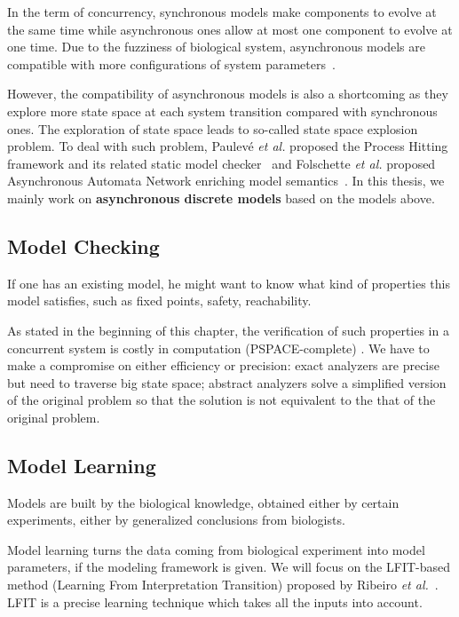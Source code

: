 In the term of concurrency, synchronous models make components to evolve at the same time while asynchronous ones allow at most one component to evolve at one time.
Due to the fuzziness of biological system, asynchronous models are compatible with more configurations of system parameters~\cite{bernot2009}.

However, the compatibility of asynchronous models is also a shortcoming as they explore more state space at each system transition compared with synchronous ones.
The exploration of state space leads to so-called state space explosion problem.
To deal with such problem, Paulev\'e \textit{et al.} proposed the Process Hitting framework and its related static model checker~\cite{pauleve2012} and Folschette \textit{et al.} proposed Asynchronous Automata Network enriching model semantics~\cite{folschette2015}.
In this thesis, we mainly work on \textbf{asynchronous discrete models} based on the models above.

\subsection{Model Checking}
If one has an existing model, he might want to know what kind of properties this model satisfies, such as fixed points, safety, reachability.

As stated in the beginning of this chapter, the verification of such properties in a concurrent system is costly in computation (PSPACE-complete) \cite{harel2002complexity}.
We have to make a compromise on either efficiency or precision: exact analyzers are precise but need to traverse big state space; abstract analyzers solve a simplified version of the original problem so that the solution is not equivalent to the that of the original problem.

\subsection{Model Learning}
Models are built by the biological knowledge, obtained either by certain experiments, either by generalized conclusions from biologists.

Model learning turns the data coming from biological experiment into model parameters, if the modeling framework is given.
We will focus on the LFIT-based method (Learning From Interpretation Transition) proposed by Ribeiro \textit{et al.}~\cite{ribeiro2015learning,ribeiro2018learning,ribeiro2017inductive}.
LFIT is a precise learning technique which takes all the inputs into account.

